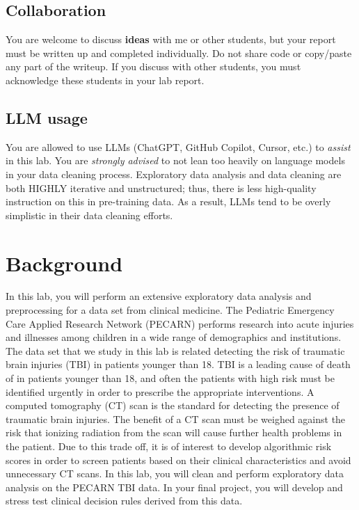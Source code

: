 \documentclass[10pt,letterpaper]{article}
\begin{document}
\subsection*{Collaboration}

You are welcome to discuss \textbf{ideas} with me or other students, but your report must be written up and completed individually. Do not share code or copy/paste any part of the writeup. If you discuss with other students, you must acknowledge these students in your lab report.

\subsection*{LLM usage}

You are allowed to use LLMs (ChatGPT, GitHub Copilot, Cursor, etc.) to \textit{assist} in this lab.
%
You are \textit{strongly advised} to not lean too heavily on language models in your data cleaning process.
%
Exploratory data analysis and data cleaning are both HIGHLY iterative and unstructured; thus, there is less high-quality instruction on this in pre-training data.
%
As a result, LLMs tend to be overly simplistic in their data cleaning efforts.

\section*{Background}

In this lab, you will perform an extensive exploratory data analysis and preprocessing for a data set from clinical medicine. The Pediatric Emergency Care Applied Research Network (PECARN) performs research into acute injuries and illnesses among children in a wide range of demographics and institutions. The data set that we study in this lab is related detecting the risk of traumatic brain injuries (TBI) in patients younger than 18. TBI is a leading cause of death of in patients younger than 18, and often the patients with high risk must be identified urgently in order to prescribe the appropriate interventions. A computed tomography (CT) scan is the standard for detecting the presence of traumatic brain injuries. The benefit of a CT scan must be weighed against the risk that ionizing radiation from the scan will cause further health problems in the patient. Due to this trade off, it is of interest to develop algorithmic risk scores in order to screen patients based on their clinical characteristics and avoid unnecessary CT scans. In this lab, you will clean and perform exploratory data analysis on the PECARN TBI data. In your final project, you will develop and stress test clinical decision rules derived from this data.
\end{document}

